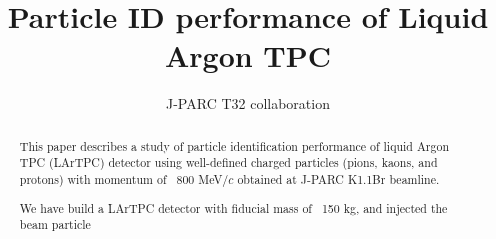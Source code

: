 \documentclass[preprint,12pt]{elsarticle}
\begin{document}
\begin{frontmatter}



\title{Particle ID performance of Liquid Argon TPC}


\author{J-PARC T32 collaboration}

\address{}

\begin{abstract}

This paper describes a study of particle identification performance of
liquid Argon TPC (LArTPC) detector using well-defined charged particles
(pions, kaons, and protons) with momentum of ~800 MeV/$c$
obtained at J-PARC K1.1Br beamline.

We have build a LArTPC detector with fiducial mass of ~150 kg,
and injected the beam particle

\end{abstract}

\begin{keyword}


\end{keyword}

\end{frontmatter}

\end{document}
